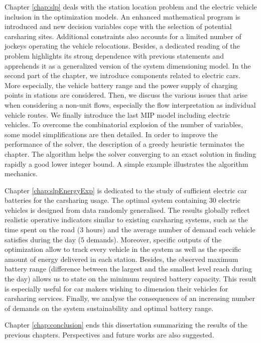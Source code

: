 \begin{bibunit}[ieeetr]
\medskip
Chapter \ref{chap:slp} deals with the station location problem and the electric vehicle inclusion in the optimization models.
An enhanced mathematical program is introduced and new decision variables cope with the selection of potential carsharing sites.
Additional constraints also accounts for a limited number of jockeys operating the vehicle relocations.
Besides, a dedicated reading of the problem highlights its strong dependence with previous statements and apprehends it as a generalized version of the system dimensioning model.
In the second part of the chapter, we introduce components related to electric cars.
More especially, the vehicle battery range and the power supply of charging points in stations are considered.
Then, we discuss the various issues that arise when considering a non-unit flows, especially the flow interpretation as individual vehicle routes.
We finally introduce the last MIP model including electric vehicles.
To overcome the combinatorial explosion of the number of variables, some model simplifications are then detailed.
In order to improve the performance of the solver, the description of a greedy heuristic terminates the chapter.
The algorithm helps the solver converging to an exact solution in finding rapidly a good lower integer bound.
A simple example illustrates the algorithm mechanics.


\medskip
Chapter \ref{chap:slpEnergyExp} is dedicated to the study of sufficient electric car batteries for the carsharing usage.
The optimal system containing $30$ electric vehicles is designed from data randomly generalised.
The results globally reflect realistic operative indicators similar to existing carsharing systems, such as the time spent on the road ($3$ hours) and the average number of demand each vehicle satisfies during the day ($5$ demands).
Moreover, specific outputs of the optimization allow to track every vehicle in the system as well as the specific amount of energy delivered in each station.
Besides, the observed maximum battery range (difference between the largest and the smallest level reach during the day) allows us to state on the minimum required battery capacity.
This result is especially useful for car makers wishing to dimension their vehicles for carsharing services.
Finally, we analyse the consequences of an increasing number of demands on the system sustainability and optimal battery range.


\medskip
Chapter \ref{chap:conclusion} ends this dissertation summarizing the results of the previous chapters.
Perspectives and future works are also suggested.



\end{bibunit}
